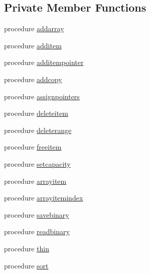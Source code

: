 \subsection*{Private Member Functions}
\begin{DoxyCompactItemize}
\item 
procedure \mbox{\hyperlink{structobjectlists_1_1tobjectlist_a46a5b2bc5a1fd09b586cfc2f721d792b}{addarray}}
\item 
procedure \mbox{\hyperlink{structobjectlists_1_1tobjectlist_af23641610e30b3afe0158cd508f4f7c6}{additem}}
\item 
procedure \mbox{\hyperlink{structobjectlists_1_1tobjectlist_a0b26dfa66c2b7f6acefcb44b52c3ecc2}{additempointer}}
\item 
procedure \mbox{\hyperlink{structobjectlists_1_1tobjectlist_a4b745e6ef7a0e708b2ab647fa7b8791a}{addcopy}}
\item 
procedure \mbox{\hyperlink{structobjectlists_1_1tobjectlist_a2d4ff37069ef6e818b21f2f0bef8b7cf}{assignpointers}}
\item 
procedure \mbox{\hyperlink{structobjectlists_1_1tobjectlist_aa5c0ef357bf45758ad11e241892ca976}{deleteitem}}
\item 
procedure \mbox{\hyperlink{structobjectlists_1_1tobjectlist_afecaadea9df9fecc713c35dcfa9a0989}{deleterange}}
\item 
procedure \mbox{\hyperlink{structobjectlists_1_1tobjectlist_aa859443f76f02a2e730a4487a59676b6}{freeitem}}
\item 
procedure \mbox{\hyperlink{structobjectlists_1_1tobjectlist_af73df00f61b768368c1f949bc5eeb1b3}{setcapacity}}
\item 
procedure \mbox{\hyperlink{structobjectlists_1_1tobjectlist_a14feee4701949d8ea3865f2997c107c0}{arrayitem}}
\item 
procedure \mbox{\hyperlink{structobjectlists_1_1tobjectlist_a54db0e2832d89c40cc0e33555faaefb7}{arrayitemindex}}
\item 
procedure \mbox{\hyperlink{structobjectlists_1_1tobjectlist_a3b1d8a813bc0d72a93ea25efeb1fa935}{savebinary}}
\item 
procedure \mbox{\hyperlink{structobjectlists_1_1tobjectlist_a569d7cac074a4a1ba868d31a39a80f29}{readbinary}}
\item 
procedure \mbox{\hyperlink{structobjectlists_1_1tobjectlist_a777bf33b20eed31a2e7adb474b00d01a}{thin}}
\item 
procedure \mbox{\hyperlink{structobjectlists_1_1tobjectlist_a69e6a5ca75c868a71d75f3a394b6a36d}{sort}}
\item 

\end{DoxyCompactItemize}
